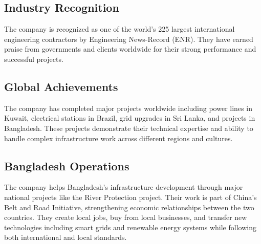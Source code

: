 \subsection{Industry Recognition}
The company is recognized as one of the world's 225 largest international engineering contractors by Engineering News-Record (ENR). They have earned praise from governments and clients worldwide for their strong performance and successful projects.

\vspace{0.3em}
\subsection{Global Achievements}
The company has completed major projects worldwide including power lines in Kuwait, electrical stations in Brazil, grid upgrades in Sri Lanka, and projects in Bangladesh. These projects demonstrate their technical expertise and ability to handle complex infrastructure work across different regions and cultures.

\vspace{0.3em}
\subsection{Bangladesh Operations}
The company helps Bangladesh's infrastructure development through major national projects like the River Protection project. Their work is part of China's Belt and Road Initiative, strengthening economic relationships between the two countries. They create local jobs, buy from local businesses, and transfer new technologies including smart grids and renewable energy systems while following both international and local standards.


